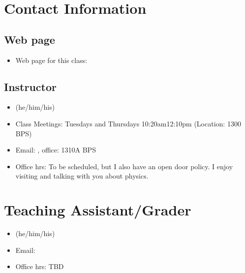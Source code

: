 \documentclass[letterpaper,10pt,english]{jupyterBook}
\begin{document}
\section{Contact Information}
\label{\detokenize{content/0_course/0_syllabus:contact-information}}

\subsection{Web page}
\label{\detokenize{content/0_course/0_syllabus:web-page}}\begin{itemize}
\item {} 
\sphinxAtStartPar
Web page for this class:

\end{itemize}


\subsection{Instructor}
\label{\detokenize{content/0_course/0_syllabus:instructor}}\begin{itemize}
\item {} 
\sphinxAtStartPar
{} (he/him/his)

\item {} 
\sphinxAtStartPar
Class Meetings: Tuesdays and Thursdays 10:20am\sphinxhyphen{}12:10pm (Location: 1300 BPS)

\item {} 
\sphinxAtStartPar
Email: , office: 1310\sphinxhyphen{}A BPS

\item {} 
\sphinxAtStartPar
Office hrs: To be scheduled, but I also have an open door policy. I enjoy visiting and talking with you about physics.

\end{itemize}


\section{Teaching Assistant/Grader}
\label{\detokenize{content/0_course/0_syllabus:teaching-assistant-grader}}\begin{itemize}
\item {} 
\sphinxAtStartPar
{} (he/him/his)

\item {} 
\sphinxAtStartPar
Email: 

\item {} 
\sphinxAtStartPar
Office hrs: TBD

\end{itemize}
\end{document}
